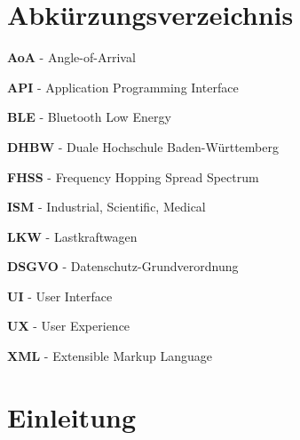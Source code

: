 \documentclass[a4paper, 12pt]{article} %
\begin{document}
\clearpage
\listoffigures

\clearpage

\section*{Abkürzungsverzeichnis}
\begin{spacing}{1.8}  %
    \fontsize{14pt}{15pt}\selectfont  %

   \textbf{AoA}  - Angle-of-Arrival

   \textbf{API} - Application Programming Interface

   \textbf{BLE} - Bluetooth Low Energy

   \textbf{DHBW} - Duale Hochschule Baden-Württemberg

   \textbf{FHSS} - Frequency Hopping Spread Spectrum

   \textbf{ISM} - Industrial, Scientific, Medical

   \textbf{LKW} - Lastkraftwagen

   \textbf{DSGVO} - Datenschutz-Grundverordnung

   \textbf{UI} - User Interface

   \textbf{UX} - User Experience

   \textbf{XML} - Extensible Markup Language


\end{spacing}

\clearpage


\tableofcontents

\clearpage

\setcounter{page}{1}

\section{Einleitung}
\begin{spacing}{1.8}  %
    \fontsize{14pt}{15pt}\selectfont  %

\end{spacing}
\end{document}

